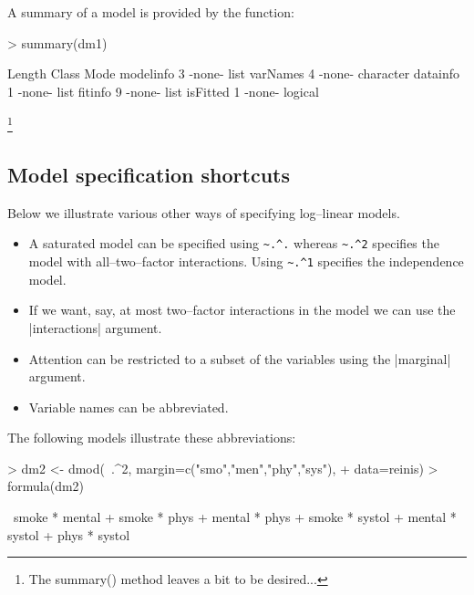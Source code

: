 \documentclass[12pt]{article}
\begin{document}
A summary of a model is provided by the  function:

\begin{Schunk}
\begin{Sinput}
> summary(dm1)
\end{Sinput}
\begin{Soutput}
          Length Class  Mode     
modelinfo 3      -none- list     
varNames  4      -none- character
datainfo  1      -none- list     
fitinfo   9      -none- list     
isFitted  1      -none- logical  
\end{Soutput}
\end{Schunk}

\footnote{The summary() method leaves a bit to be desired...}



\subsection{Model specification shortcuts}
\label{sec:shortcut}

Below we illustrate various other ways of specifying log--linear
models.

\begin{itemize}
\item A saturated model can be specified using \verb|~.^.| whereas
\verb|~.^2| specifies the model with all--two--factor
interactions. Using \verb|~.^1| specifies the independence model.

\item If we want, say, at most two--factor interactions in the
model we can use the |interactions| argument.

\item Attention can be restricted to a subset of the variables
using the |marginal| argument.

\item Variable names can be abbreviated.

\end{itemize}

The following models illustrate these abbreviations:

\begin{Schunk}
\begin{Sinput}
> dm2 <- dmod(~.^2, margin=c("smo","men","phy","sys"),
+             data=reinis)
> formula(dm2)
\end{Sinput}
\begin{Soutput}
~smoke * mental + smoke * phys + mental * phys + smoke * systol + 
    mental * systol + phys * systol
\end{Soutput}
\end{Schunk}
\end{document}
